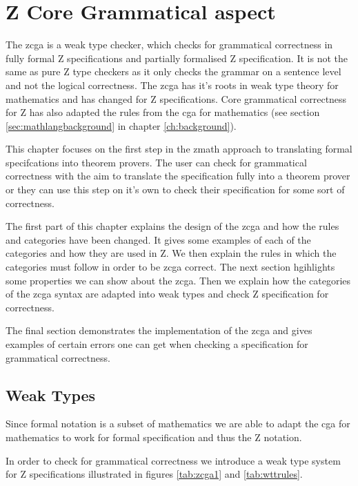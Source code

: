 \chapter{Z Core Grammatical aspect}
\label{ch:zcga}

The \gls{zcga} is a weak type checker, which checks for grammatical correctness in fully formal Z specifications and partially formalised Z specification. It is not the same as pure Z type checkers as it only checks the grammar on a sentence level and not the logical correctness. The \gls{zcga} has it's roots in weak type theory for mathematics \cite{wtt} and has changed for Z specifications. Core grammatical correctness for Z has also adapted the rules from the \gls{cga} for mathematics (see section \ref{sec:mathlangbackground} in chapter \ref{ch:background}).

This chapter focuses on the first step in the \gls{zmath} approach to translating formal specifcations into theorem provers. The user can check for grammatical correctness with the aim to translate the specification fully into a theorem prover or they can use this step on it's own to check their specification for some sort of correctness.

The first part of this chapter explains the design of the \gls{zcga} and how the rules and categories have been changed. It gives some examples of each of the categories and how they are used in Z. We then explain the rules in which the categories must follow in order to be \gls{zcga} correct. The next section hgihlights some properties we can show about the \gls{zcga}. Then we explain how the categories of the \gls{zcga} syntax are adapted into weak types and check Z specification for correctness.

The final section demonstrates the implementation of the \gls{zcga} and gives examples of certain errors one can get when checking a specification for grammatical correctness.

\section{Weak Types}

Since formal notation is a subset of mathematics we are able to adapt the \gls{cga} for mathematics to work for formal specification and thus the Z notation.

In order to check for grammatical correctness we introduce a weak type system for Z specifications illustrated in figures \ref{tab:zcga1} and \ref{tab:wttrules}.
 

